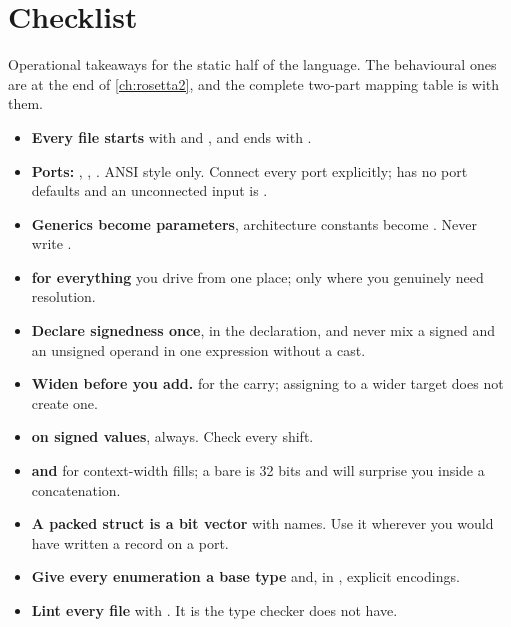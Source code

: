 \section{Checklist}
\label{sec:rosetta:checklist}

Operational takeaways for the static half of the language. The behavioural
ones are at the end of \cref{ch:rosetta2}, and the complete two-part mapping
table is with them.

\begin{itemize}
  \item \textbf{Every file starts} with  and
        , and ends with
        .
  \item \textbf{Ports:} , ,
        . ANSI style only. Connect every port explicitly;
        \SV{} has no port defaults and an unconnected input is .
  \item \textbf{Generics become parameters}, architecture constants become
        . Never write .
  \item \textbf{ for everything} you drive from one place;
         only where you genuinely need resolution.
  \item \textbf{Declare signedness once}, in the declaration, and never mix a
        signed and an unsigned operand in one expression without a cast.
  \item \textbf{Widen before you add.}  for the
        carry; assigning to a wider target does not create one.
  \item \textbf{\code{>>>} on signed values}, always. Check every shift.
  \item \textbf{ and } for context-width
        fills; a bare  is 32 bits and will surprise you inside a
        concatenation.
  \item \textbf{A packed struct is a bit vector} with names. Use it wherever
        you would have written a \VHDL{} record on a port.
  \item \textbf{Give every enumeration a base type} and, in \RTL{}, explicit
        encodings.
  \item \textbf{Lint every file} with .
        It is the type checker \SV{} does not have.
\end{itemize}
